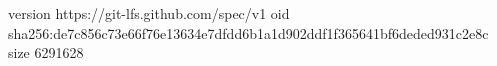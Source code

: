 version https://git-lfs.github.com/spec/v1
oid sha256:de7c856c73e66f76e13634e7dfdd6b1a1d902ddf1f365641bf6deded931c2e8c
size 6291628
